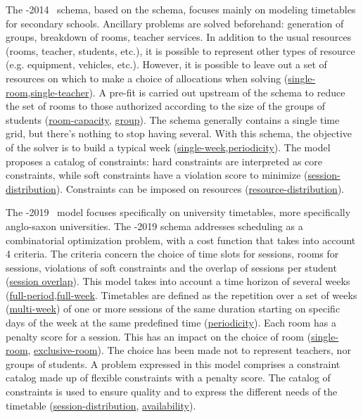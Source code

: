 \documentclass[runningheads]{llncs}
\begin{document}
The \XHSTT{}-2014~\cite{2014_demirovic_patat, 2017_demirovic_cor,2014_demirovic_lash} schema, based on the \ITC{} schema, focuses mainly on modeling timetables for secondary schools. Ancillary problems are solved beforehand: generation of groups, breakdown of rooms, teacher services.
In addition to the usual resources (rooms, teacher, students, etc.), it is possible to represent other types of resource (e.g. equipment, vehicles, etc.).
However, it is possible to leave out a set of resources on which to make a choice of allocations when solving 
(\hyperref[feat:roommodal]{single-room},\hyperref[feat:teachermodal]{single-teacher}).
A pre-fit is carried out upstream of the schema to reduce the set of rooms to those authorized according to the size of the groups of students 
(\hyperref[feat:roomcapacity]{room-capacity}, \hyperref[feat:group]{group}).
The schema generally contains a single time grid, but there's nothing to stop having several.
 With this schema, the objective of the solver is to build a typical week
 (\hyperref[feat:singleweek]{single-week},\hyperref[feat:periodicity]{periodicity}).
The model proposes a catalog of constraints: hard constraints are interpreted as core constraints, while soft constraints have a violation score to minimize 
(\hyperref[feat:sessiondistribution]{session-distribution}).
Constraints can be imposed on resources 
(\hyperref[feat:ressourcedistribution]{resource-distribution}).















The \ITC{}-2019~\cite{2018_muller_PATAT,2019_lindahl_EJOR,2019_jawa_JIM} model focuses specifically on university timetables, more specifically anglo-saxon universities. The \ITC{}-2019 schema addresses scheduling as a combinatorial optimization problem, with a cost function that takes into account 4 criteria. The criteria concern the choice of time slots for sessions, rooms for sessions, violations of soft constraints and the overlap of sessions per student 
(\hyperref[feat:studentsessionoverlap]{session overlap}).
This model takes into account a time horizon of several weeks 
(\hyperref[feat:fullperiod]{full-period},\hyperref[feat:fullweek]{full-week}.
Timetables are defined as the repetition over a set of weeks 
(\hyperref[feat:singleweek]{multi-week}) 
of one or more sessions of the same duration starting on specific days of the week at the same predefined time 
(\hyperref[feat:periodicity]{periodicity}).
Each room has a penalty score for a session. This has an impact on the choice of room 
(\hyperref[feat:roommodal]{single-room}, \hyperref[feat:roommodal]{exclusive-room}).
The choice has been made not to represent teachers, nor groups of students. A problem expressed in this model comprises a constraint catalog made up of flexible constraints with a penalty score. The catalog of constraints is used to ensure quality and to express the different needs of the timetable 
(\hyperref[feat:sessiondistribution]{session-distribution}, \hyperref[feat:availability]{availability}).
\end{document}
